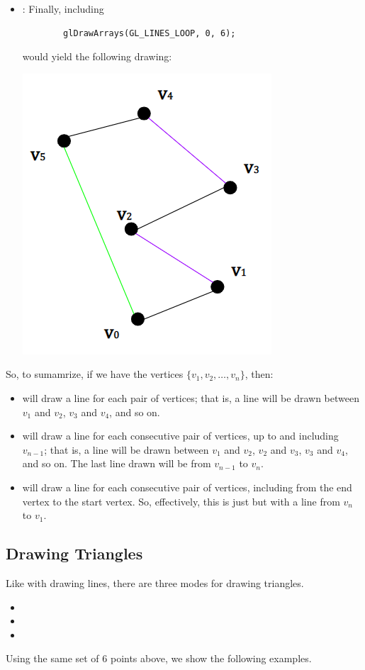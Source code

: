 \documentclass[letterpaper]{article}
\begin{document}
\begin{itemize}
    \item {}: Finally, including 
    \begin{verbatim}
        glDrawArrays(GL_LINES_LOOP, 0, 6);\end{verbatim}
    would yield the following drawing: 
    \begin{center}
        \includegraphics[scale=0.5]{../assets/points5.png}
    \end{center}
\end{itemize}


So, to sumamrize, if we have the vertices $\{v_1, v_2, \dots, v_n\}$, then: 
\begin{itemize}
    \item {} will draw a line for each pair of vertices; that is, a line will be drawn between $v_1$ and $v_2$, $v_3$ and $v_4$, and so on. 
    \item {} will draw a line for each consecutive pair of vertices, up to and including $v_{n - 1}$; that is, a line will be drawn between $v_1$ and $v_2$, $v_2$ and $v_3$, $v_3$ and $v_4$, and so on. The last line drawn will be from $v_{n - 1}$ to $v_{n}$. 
    \item {} will draw a line for each consecutive pair of vertices, including from the end vertex to the start vertex. So, effectively, this is just  but with a line from $v_n$ to $v_1$.  
\end{itemize}

\subsection{Drawing Triangles}
Like with drawing lines, there are three modes for drawing triangles. 
\begin{itemize}
    \item {}
    \item {}
    \item {}
\end{itemize}
Using the same set of 6 points above, we show the following examples. 
\end{document}
